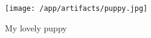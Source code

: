 \documentclass{article}
\begin{document}
\begin{figure}
	\texttt{[image: /app/artifacts/puppy.jpg]}
	\centering
	\caption{My lovely puppy}
\end{figure}
\end{document}
